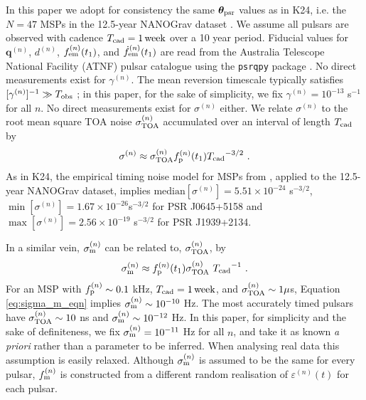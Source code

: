 \documentclass[fleqn,usenatbib,useAMS]{mnras}
\begin{document}
In this paper we adopt for consistency the same $\boldsymbol{\theta}_{\rm psr}$ values as in K24, i.e. the $N=47$ MSPs in the 12.5-year NANOGrav dataset \citep{2020ApJ...905L..34A}. We assume all pulsars are observed with cadence $T_{\rm cad} = 1 \,{\rm week}$ over a 10 year period. Fiducial values for ${\boldsymbol{q}}^{(n)}$, $d^{(n)}$, $f_{\rm em}^{(n)}(t_1)$, and $\dot{f}^{(n)}_{\rm em}(t_1)$ are read from the Australia Telescope National Facility (ATNF) pulsar catalogue \citep{Manchester2005} using the \texttt{psrqpy} package \citep{psrqpy}. No direct measurements exist for $\gamma^{(n)}$. The mean reversion timescale typically satisfies $[\gamma^{(n)}]^{-1} \gg T_{\rm obs}$ \citep{Price2012,Myers2021MNRAS.502.3113M,Meyers2021,Vargas}; in this paper, for the sake of simplicity, we fix $\gamma^{(n)} = 10^{-13}$ s$^{-1}$ for all $n$. No direct measurements exist for $\sigma^{(n)}$ either. We relate $\sigma^{(n)}$ to the root mean square TOA noise $\sigma^{(n)}_{\rm TOA}$ accumulated over an interval of length $T_{\rm cad}$ by
\begin{eqnarray}
	\sigma^{(n)} \approx \sigma_{\rm TOA}^{(n)} f_{\rm p}^{(n)}(t_1) {T_{\rm cad}}^{-3/2} \ . \label{eq:sigmap_f}
\end{eqnarray}
As in K24, the empirical timing noise model for MSPs from \cite{Shannon2010ApJ...725.1607S}, applied to the 12.5-year NANOGrav dataset, implies $\text{median} [\sigma^{(n)}] = 5.51 \times 10^{-24} $ s$^{-3/2}$, $\min [ \sigma^{(n)} ] = 1.67 \times 10^{-26}$s$^{-3/2}$ for PSR J0645+5158 and $\max [ \sigma^{(n)} ] = 2.56 \times 10^{-19}$ s$^{-3/2}$ for PSR J1939+2134. \newline 
 
In a similar vein, $\sigma_{\rm m}^{(n)}$ can be related to, $\sigma_{\rm TOA}^{(n)}$, by 
\begin{equation}
	\sigma_{\rm m}^{(n)} \approx f_{\rm p}^{(n)}(t_1) \sigma_{\rm TOA}^{(n)} \ {T_{\rm cad}}^{-1} \ . \label{eq:sigma_m_eqn}
\end{equation}
For an MSP with $f_{\rm p}^{(n)} \sim 0.1$ kHz, $T_{\rm cad} = 1 \, {\rm week}$, and $\sigma_{\rm TOA}^{(n)} \sim 1 \mu$s,  Equation \eqref{eq:sigma_m_eqn} implies $\sigma_{\rm m}^{(n)} \sim 10^{-10}$ Hz. The most accurately timed pulsars have $\sigma_{\rm TOA}^{(n)} \sim 10 $ ns and $\sigma_{\rm m}^{(n)} \sim 10^{-12}$ Hz. In this paper, for simplicity and the sake of definiteness, we fix $\sigma_{\rm m}^{(n)} = 10^{-11}$ Hz for all $n$, and take it as known \textit{a priori} rather than a parameter to be inferred. When analysing real data this assumption is easily relaxed. Although $\sigma_{\rm m}^{(n)}$ is assumed to be the same for every pulsar, $f_{\rm m} ^{(n)}$ is constructed from a different random realisation of $\varepsilon^{(n)}(t)$ for each pulsar. \newline  
\end{document}
